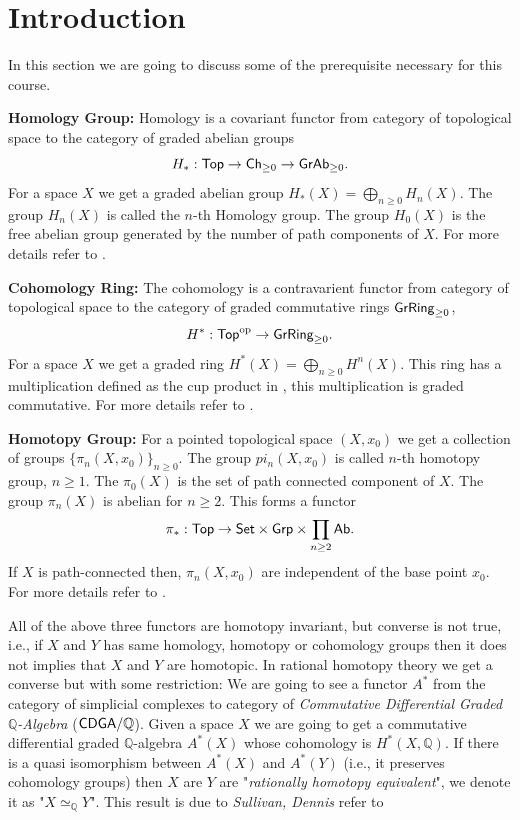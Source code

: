 
\section{Introduction}

In this section we are going to discuss some of the prerequisite necessary for this course.

\noindent\textbf{Homology Group:}
Homology is a covariant functor from category of topological space to the category of graded abelian groups
\[H_\ast: \mathsf{Top} \to \mathsf{Ch}_{\geq 0} \to \mathsf{GrAb}_{\geq 0}.\]
For a space \(X\) we get a graded abelian group \(\displaystyle H_\ast(X) = \bigoplus_{n\geq0} H_n(X)\).
The group \(H_n(X)\) is called the \(n\)-th Homology group.
The group \(H_0(X)\) is the free abelian group generated by the number of path components of \(X\).
For more details refer to \cite{Hatcher2002}.

\noindent\textbf{Cohomology Ring:}
The cohomology is a contravarient functor  from category of topological space to the category of graded commutative rings \(\mathsf{GrRing}_{\geq 0}\),
\[H^\ast: \mathsf{Top}^{\operatorname{op}} \to \mathsf{GrRing}_{\geq 0}.\]
For a space \(X\) we get a graded ring \(\displaystyle H^\ast(X) = \bigoplus_{n\geq0} H^n(X)\).
This ring has a multiplication defined as the cup product in \cite{Hatcher2002}, this multiplication is graded commutative. 
For more details refer to \cite{Hatcher2002}.

\noindent\textbf{Homotopy Group:}
For a pointed topological space \((X,x_0)\) we get a collection of groups \(\{\pi_n(X,x_0)\}_{n\geq 0}\).
The group \(pi_n(X,x_0)\) is called \(n\)-th homotopy group, \(n\geq 1\).
The \(\pi_0(X)\) is the set of path connected component of \(X\).
The group \(\pi_n(X)\) is abelian for \(n\geq 2\).
This forms a functor 
\[\pi_\ast: \mathsf{Top} \to \mathsf{Set} \times \mathsf{Grp} \times \prod_{n\geq 2} \mathsf{Ab}.\]
If \(X\) is path-connected then, \(\pi_n(X,x_0)\) are independent of the base point \(x_0\).
For more details refer to \cite{Hatcher2002}.

All of the above three functors are homotopy invariant, but converse is not true, i.e., if \(X\) and \(Y\) has same homology, homotopy or cohomology groups then it does not implies that \(X\) and \(Y\) are homotopic.
In rational homotopy theory we get a converse but with some restriction: 
We are going to see a functor \(A^\ast\) from the category of simplicial complexes to category of \emph{Commutative Differential Graded \(\mathbb Q\)-Algebra} (\(\mathsf{CDGA}/\mathbb Q\)). 
Given a space \(X\) we are going to get a commutative differential graded \(\mathbb Q\)-algebra \(A^\ast(X)\) whose cohomology is \(H^\ast(X,\mathbb Q)\).
If there is a quasi isomorphism  between \(A^\ast(X)\) and \(A^\ast(Y)\) (i.e., it preserves cohomology groups) then \(X\) are \(Y\) are "\emph{rationally homotopy equivalent}", we denote it as "\(X \simeq_\mathbb Q Y\)".
This result is due to \emph{Sullivan, Dennis} refer to \cite{PMIHES_1977__47__269_0}

